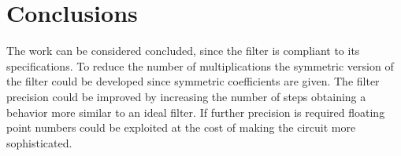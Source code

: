 \section{Conclusions}
The work can be considered concluded, since the filter is compliant to its specifications. To reduce the number of multiplications the symmetric version of the filter could be developed since symmetric coefficients are given. The filter precision could be improved by increasing the number of steps obtaining a behavior more similar to an ideal filter. If further precision is required floating point numbers could be exploited at the cost of making the circuit more sophisticated.